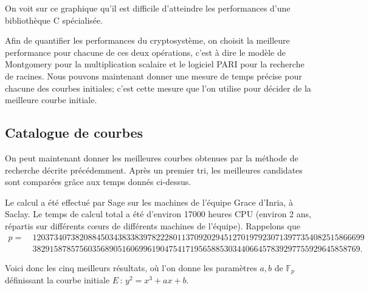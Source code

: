 \documentclass[11pt,a4paper]{article}
\newcommand{\F}{\mathbb{F}}
\newcommand{\de}{\,:\,}
\renewcommand{\v}{\vspace{5mm}}
\theoremstyle{definition}
\begin{document}
On voit sur ce graphique qu'il est difficile d'atteindre les performances d'une bibliothèque C spécialisée.

\v
Afin de quantifier les performances du cryptosystème, on choisit la meilleure performance pour chacune de ces deux opérations, c'est à dire le modèle de Montgomery pour la multiplication scalaire et le logiciel PARI pour la recherche de racines. Nous pouvons maintenant donner une mesure de temps précise pour chacune des courbes initiales; c'est cette mesure que l'on utilise pour décider de la meilleure courbe initiale.

\subsection{Catalogue de courbes}

On peut maintenant donner les meilleures courbes obtenues par la méthode de recherche décrite précédemment. Après un premier tri, les meilleures candidates sont comparées grâce aux temps donnés ci-dessus.

Le calcul a été effectué par Sage sur les machines de l'équipe Grace d'Inria, à Saclay. Le temps de calcul total a été d'environ 17000 heures CPU (environ 2 ans, répartis sur différents c\oe urs de différents machines de l'équipe). Rappelons que
$$ \begin{aligned}
p = \ &120373407382088450343833839782228011370920294512701979230713977354082515866699 \\
&38291587857560356890516069961904754171956588530344066457839297755929645858769.
\end{aligned}$$

Voici donc les cinq meilleurs résultats, où l'on donne les paramètres $a, b$ de $\F_p$ définissant la courbe initiale 
$E\de y^2 = x^3 + ax + b$.
\end{document}

